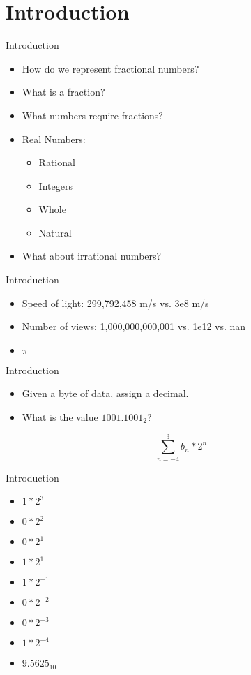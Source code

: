 \section{Introduction}
\begin{frame}{Introduction}
  \begin{itemize}
  \item How do we represent fractional numbers?
  \item What is a fraction?
  \item What numbers require fractions?
  \item Real Numbers:
    \begin{itemize}
    \item Rational
    \item Integers
    \item Whole
    \item Natural
    \end{itemize}
  \item What about irrational numbers?
  \end{itemize}
\end{frame}
\begin{frame}{Introduction}
  \begin{itemize}
  \item Speed of light: 299,792,458 m/s vs. 3e8 m/s
  \item Number of views: 1,000,000,000,001 vs. 1e12 vs. nan
  \item $\pi$
  \end{itemize}
\end{frame}
\begin{frame}{Introduction}
  \begin{itemize}
  \item Given a byte of data, assign a decimal.
  \item What is the value $1001.1001_{2}$?
  \end{itemize}
  \begin{equation}
    \sum_{n=-4}^{3} b_{n}*2^{n}
  \end{equation}
\end{frame}
\begin{frame}{Introduction}
  \begin{itemize}
  \item $1 * 2^{3}$
  \item $0 * 2^{2}$
  \item $0 * 2^{1}$
  \item $1 * 2^{1}$
  \item $1 * 2^{-1}$
  \item $0 * 2^{-2}$
  \item $0 * 2^{-3}$
  \item $1 * 2^{-4}$
    \item $9.5625_{10}$
  \end{itemize}
\end{frame}
